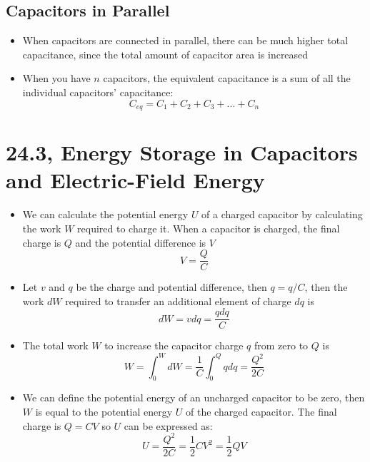 \documentclass[11pt, a4paper]{article}
\begin{document}
\subsection{Capacitors in Parallel}
\begin{itemize}
    \item When capacitors are connected in parallel, there can be much higher total
        capacitance, since the total amount of capacitor area is increased
    \item When you have $n$ capacitors, the equivalent capacitance is a sum of all the
        individual capacitors' capacitance:
        \begin{equation}
            C_{eq} = C_1 + C_2 + C_3 + ... + C_n
        \end{equation}
\end{itemize}

\section{24.3, Energy Storage in Capacitors and Electric-Field Energy}
\begin{itemize}
    \item We can calculate the potential energy $U$ of a charged capacitor by calculating
        the work $W$ required to charge it. When a capacitor is charged, the final charge
        is $Q$ and the potential difference is $V$
        \begin{equation}
            V = \frac{Q}{C}
        \end{equation}
    \item Let $v$ and $q$ be the charge and potential difference, then $q = q / C$, then
        the work $dW$ required to transfer an additional element of charge $dq$ is
        \begin{equation}
            dW = vdq = \frac{qdq}{C}
        \end{equation}
    \item The total work $W$ to increase the capacitor charge $q$ from zero to $Q$ is
        \begin{equation}
            {W} = \int_0^{W} dW = \frac{1}{C}\int_0^{Q} qdq = \frac{Q^2}{2C}
        \end{equation}
    \item We can define the potential energy of an uncharged capacitor to be zero, then
        $W$ is equal to the potential energy $U$ of the charged capacitor. The final
        charge is $Q = CV$ so $U$ can be expressed as:
        \begin{equation}
            U = \frac{Q^2}{2C} = \frac{1}{2}CV^2 = \frac{1}{2}QV
        \end{equation}
\end{itemize}
\end{document}
